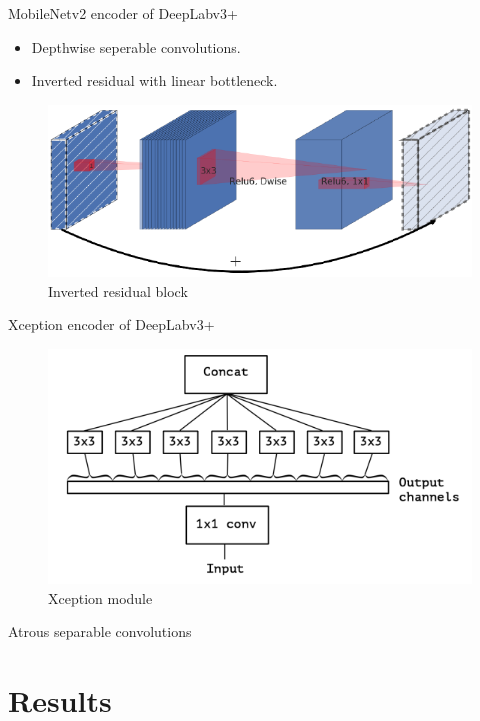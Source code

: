 \documentclass{beamer}
\begin{document}
\begin{frame}{MobileNetv2 encoder of DeepLabv3+}

	\begin{itemize}
		\item Depthwise seperable convolutions.
		\item Inverted residual with linear bottleneck.
	\end{itemize}
	
	\begin{figure}
		\centering
		\includegraphics[width=.6\linewidth]{images/inverted_residual}
		\caption{Inverted residual block}
		\label{Fig:residual}
	\end{figure}

\end{frame}

\begin{frame}{Xception encoder of DeepLabv3+}

	\begin{figure}[h]
		\centering
		\includegraphics[width=0.5\linewidth]{images/extreme_inception}
		\caption{Xception module}
		\label{Fig:xception}
	\end{figure}

\end{frame}

\begin{frame}{Atrous separable convolutions}


\end{frame}

\section{Results}
\end{document}
